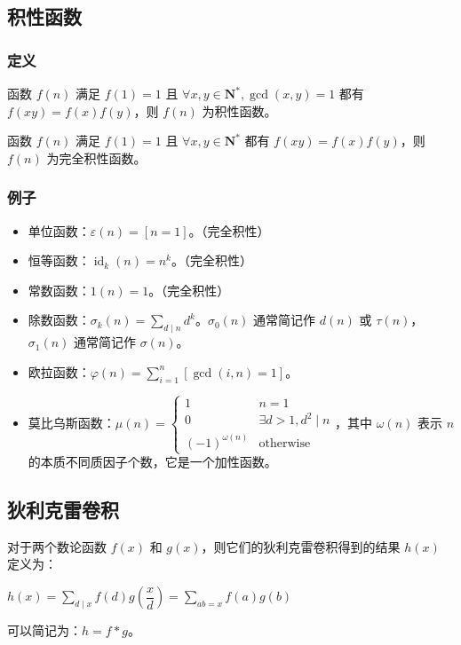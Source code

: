 \documentclass[UTF8]{ctexart}
\begin{document}
\begin{sloppypar}
\subsection{积性函数}

\subsubsection{定义}

函数 $f(n)$ 满足 $f(1)=1$ 且 $\forall x,y\in\mathbf{N}^*,\gcd(x,y)=1$ 都有 $f(xy)=f(x)f(y)$，则 $f(n)$ 为积性函数。

函数 $f(n)$ 满足 $f(1)=1$ 且 $\forall x,y\in\mathbf{N}^*$ 都有 $f(xy)=f(x)f(y)$，则 $f(n)$ 为完全积性函数。

\subsubsection{例子}

\begin{itemize}
   \item 单位函数：$\varepsilon(n)=[n=1]$。（完全积性）
   \item 恒等函数：$\operatorname{id}_k(n)=n^k$。（完全积性）
   \item 常数函数：$1(n)=1$。（完全积性）
   \item 除数函数：$\sigma_{k}(n)=\sum_{d\mid n}d^{k}$。$\sigma_{0}(n)$ 通常简记作 $d(n)$ 或 $\tau(n)$，$\sigma_{1}(n)$ 通常简记作 $\sigma(n)$。
   \item 欧拉函数：$\varphi(n)=\sum_{i=1}^n[\gcd(i,n)=1]$。
   \item 莫比乌斯函数：$\mu(n)=\begin{cases}1&n=1\\0&\exists d>1,d^{2}\mid n\\(-1)^{\omega(n)}&\text{otherwise}\end{cases}$，其中 $\omega(n)$ 表示 $n$ 的本质不同质因子个数，它是一个加性函数。
\end{itemize}

\subsection{狄利克雷卷积}

对于两个数论函数 $f(x)$ 和 $g(x)$，则它们的狄利克雷卷积得到的结果 $h(x)$ 定义为：

$h(x)=\sum_{d\mid x}{f(d)g\left(\dfrac xd \right)}=\sum_{ab=x}{f(a)g(b)}$

可以简记为：$h=f*g$。


\end{sloppypar}
\end{document}
